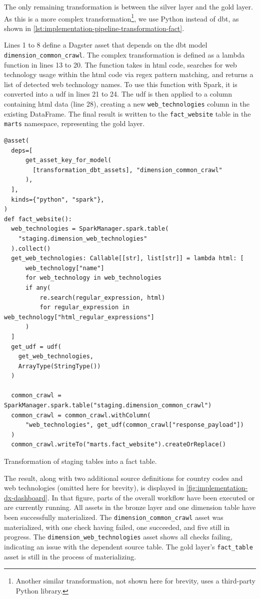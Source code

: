 The only remaining transformation is between the silver layer and the gold layer.
As this is a more complex transformation\footnote{Another similar transformation, not shown here for brevity, uses a third-party Python library.}, we use Python instead of dbt, as shown in \cref{lst:implementation-pipeline-transformation-fact}.

Lines 1 to 8 define a Dagster asset that depends on the dbt model \texttt{dimension\_common\_crawl}.
The complex transformation is defined as a lambda function in lines 13 to 20.
The function takes in \ac{html} code, searches for web technology usage within the \ac{html} code via \ac{regex} pattern matching, and returns a list of detected web technology names.
To use this function with Spark, it is converted into a \ac{udf} in lines 21 to 24.
The \ac{udf} is then applied to a column containing \ac{html} data (line 28), creating a new \texttt{web\_technologies} column in the existing DataFrame.
The final result is written to the \texttt{fact\_website} table in the \texttt{marts} namespace, representing the gold layer.

\begin{listing}[H]
\begin{verbatim}
@asset(
  deps=[
      get_asset_key_for_model(
        [transformation_dbt_assets], "dimension_common_crawl"
      ),
  ],
  kinds={"python", "spark"},
)
def fact_website():
  web_technologies = SparkManager.spark.table(
    "staging.dimension_web_technologies"
  ).collect()
  get_web_technologies: Callable[[str], list[str]] = lambda html: [
      web_technology["name"]
      for web_technology in web_technologies
      if any(
          re.search(regular_expression, html)
          for regular_expression in web_technology["html_regular_expressions"]
      )
  ]
  get_udf = udf(
    get_web_technologies,
    ArrayType(StringType())
  )

  common_crawl = SparkManager.spark.table("staging.dimension_common_crawl")
  common_crawl = common_crawl.withColumn(
      "web_technologies", get_udf(common_crawl["response_payload"])
  )
  common_crawl.writeTo("marts.fact_website").createOrReplace()
\end{verbatim}
\caption{Transformation of staging tables into a fact table.}
\label{lst:implementation-pipeline-transformation-fact}
\end{listing}

The result, along with two additional source definitions for country codes and web technologies (omitted here for brevity), is displayed in \cref{fig:implementation-dx-dashboard}.
In that figure, parts of the overall workflow have been executed or are currently running.
All assets in the bronze layer and one dimension table have been successfully materialized.
The \texttt{dimension\_common\_crawl} asset was materialized, with one check having failed, one succeeded, and five still in progress.
The \texttt{dimension\_web\_technologies} asset shows all checks failing, indicating an issue with the dependent source table.
The gold layer's \texttt{fact\_table} asset is still in the process of materializing.

